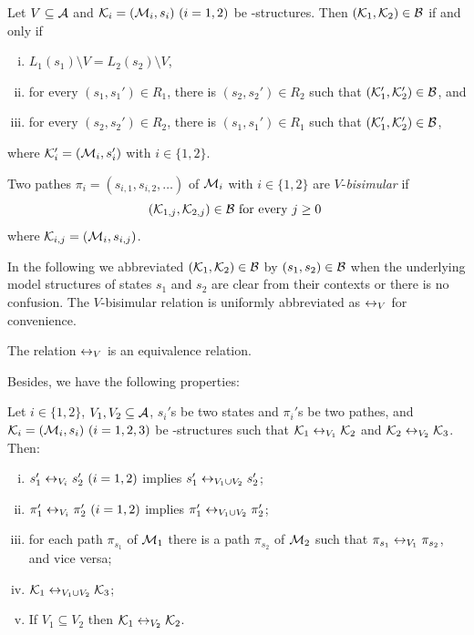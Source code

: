 \documentclass{article}
\begin{document}
\begin{proposition}\label{Vbi:Equ}
Let $V\subseteq\cal A$
and ${\cal K}_i=({\cal M}_i,s_i)~(i=1,2)$ be \MPK-structures.
Then $({\cal K}_1,{\cal K}_2)\in\cal B$ if and only if
  \begin{enumerate}[(i)]
    \item $L_1(s_1)\setminus V = L_2(s_2)\setminus V$,
    \item for every $(s_1,s_1')\in R_1$, there is $(s_2,s_2')\in R_2$
    such that $({\cal K}_1',{\cal K}_2')\in {\cal B}$, and
    \item for every $(s_2,s_2')\in R_2$, there is $(s_1,s_1')\in R_1$
    such that $({\cal K}_1',{\cal K}_2')\in {\cal B}$,
   \end{enumerate}
 where ${\cal K}_i'=({\cal M}_i,s_i')$ with $i\in\{1,2\}$.
\end{proposition}


Two pathes $\pi_i=(s_{i,1},s_{i,2},\ldots)$ of ${\cal M}_i$ with $i\in \{1,2\}$
 are $V$-{\em bisimular} if
 \[({\cal K}_{1,j},{\cal K}_{2,j})\in {\cal B} \mbox { for every $j\ge 0$ }\]
 where ${\cal K}_{i,j}=({\cal M}_i,s_{i,j})$.

 In the following we abbreviated $({\cal K}_1,{\cal K}_2)\in \cal B$
 by $(s_1,s_2)\in \cal B$
 when the underlying model structures of states $s_1$ and $s_2$ are clear from their contexts
 or there is no confusion.
  The $V$-bisimular relation is uniformly abbreviated as $\leftrightarrow_V$ for convenience.%
\begin{lemma}\label{lem:equive}
  The relation $\leftrightarrow_V$ is an equivalence relation.
\end{lemma}

Besides, we have the following properties:
\begin{proposition}\label{div}
Let $i\in \{1,2\}$, $V_1,V_2\subseteq\cal A$, $s_i'$s be two states and
  $\pi_i'$s be two pathes,
and ${\cal K}_i=({\cal M}_i,s_i)~(i=1,2,3)$ be \MPK-structures
 such that
${\cal K}_1\leftrightarrow_{V_1}{\cal K}_2$ and ${\cal K}_2\leftrightarrow_{V_2}{\cal K}_3$.
 Then:
 \begin{enumerate}[(i)]
   \item $s_1'\leftrightarrow_{V_i}s_2'~(i=1,2)$ implies $s_1'\leftrightarrow_{V_1\cup V_2}s_2'$;
   \item $\pi_1'\leftrightarrow_{V_i}\pi_2'~(i=1,2)$ implies $\pi_1'\leftrightarrow_{V_1\cup V_2}\pi_2'$;
   \item for each path $\pi_{s_1}$ of ${\cal M}_1$ there is a path $\pi_{s_2}$  of ${\cal M}_2$ such that $\pi_{s_1} \leftrightarrow_{V_1} \pi_{s_2}$, and vice versa;
   \item ${\cal K}_1\leftrightarrow_{V_1\cup V_2}{\cal K}_3$;
   \item If $V_1 \subseteq V_2$ then ${\cal K}_1 \leftrightarrow_{V_2} {\cal K}_2$.
 \end{enumerate}
\end{proposition}
\end{document}
